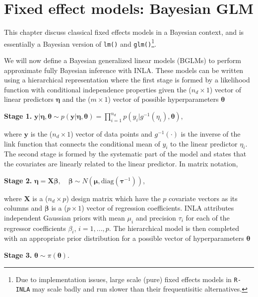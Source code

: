 \documentclass[a4paper,11pt]{report}
\newcommand{\tv}{\texttt}
\def\bs#1{\ensuremath{\boldsymbol{#1}}} %
\begin{document}
\chapter{Fixed effect models: Bayesian GLM}

This chapter discuss classical fixed effects models in a Bayesian
context, and is essentially a Bayesian version of \verb|lm()| and
\verb|glm()|\footnote{Due to implementation issues, large scale (pure)
    fixed effects models in \tv{R-INLA} may scale badly and run slower
    than their frequentisitic alternatives.}.

We will now define a Bayesian generalized linear models (BGLMs) to
perform approximate fully Bayesian inference with INLA. These models
can be written using a hierarchical representation where the first
stage is formed by a likelihood function with conditional independence
properties given the ($n_d \times 1$) vector of linear predictors
$\bs{\eta}$ and the ($m \times 1$) vector of possible hyperparameters
$\bs{\theta}$
\begin{list}{}{\leftmargin=5em}
\item[\textbf{Stage 1.}] $\bs{y}|\bs{\eta},\bs{\theta} \sim
    p(\bs{y}|\bs{\eta},\bs{\theta}) = \prod _{i=1}^{n_d} p(y_i|g^{-1}
    (\eta _i), \bs{\theta})$,
\end{list}
where $\bs{y}$ is the ($n_d \times 1$) vector of data points and
$g^{-1}(\cdot)$ is the inverse of the link function that connects the
conditional mean of $y_i$ to the linear predictor $\eta _i$.  The
second stage is formed by the systematic part of the model and states
that the covariates are linearly related to the linear predictor. In
matrix notation,
\begin{list}{}{\leftmargin=5em}
\item[\textbf{Stage 2.}] $\bs{\eta} = \bs{X} \bs{\beta}, \quad
    \bs{\beta} \sim N(\bs{\mu}, \text{diag}(\bs{\tau}^{-1}))$,
\end{list}
where $\bs{X}$ is a ($n_d \times p$) design matrix which have the $p$
covariate vectors as its columns and $\bs{\beta}$ is a ($p \times 1$)
vector of regression coefficients. INLA attributes independent
Gaussian priors with mean $\mu _i$ and precision $\tau_i$ for each of
the regressor coefficients $\beta_i$, $i = 1,...,p$.  The hierarchical
model is then completed with an appropriate prior distribution for a
possible vector of hyperparameters $\bs{\theta}$
\begin{list}{}{\leftmargin=5em}
  \item[\textbf{Stage 3.}] $\bs{\theta} \sim \pi(\bs{\theta})$.
\end{list}
\end{document}

